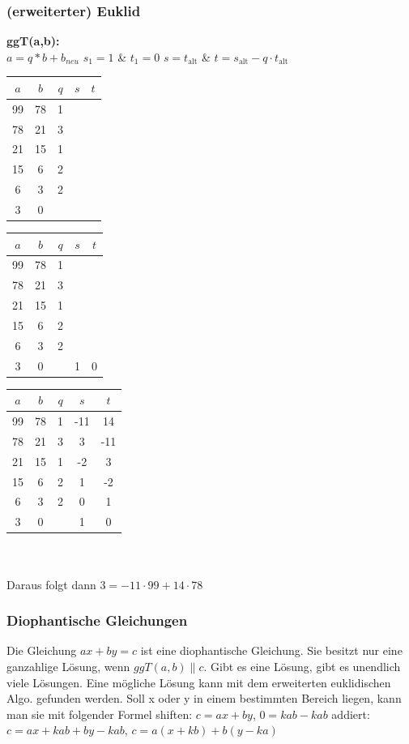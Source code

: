 \documentclass[landscape,twocolumn,a4paper]{article}
\newcommand{\T}[1]{\text{#1}} %
\begin{document}
\subsubsection{(erweiterter) Euklid}
\textbf{ggT(a,b):} \\
$a=q*b+b_{neu}$ \hspace*{1cm} $s_1=1$ \& $t_1=0$ \hspace*{0.75cm} $s=t_{\T{alt}}$ \& $t=s_{\T{alt}}-q\cdot t_{\T{alt}}$\\
\begin{tabular}{| c | c | c | c | c |}
   \hline
   $a$ & $b$ & $q$ & $s$ & $t$ \\
   \hline
   99 & 78 & 1 &  & \\
   78 & 21 & 3 &  & \\
   21 & 15 & 1 &  & \\
   15 & 6 & 2 &  & \\
   6 & 3 & 2 &  & \\
   3 & 0 &  &  & \\\hline
\end{tabular}
\begin{tabular}{| c | c | c | c | c |}
   \hline
   $a$ & $b$ & $q$ & $s$ & $t$ \\
   \hline
   99 & 78 & 1 &  & \\
   78 & 21 & 3 &  & \\
   21 & 15 & 1 &  & \\
   15 & 6 & 2 &  & \\
   6 & 3 & 2 &  & \\
   3 & 0 &  & 1 & 0 \\\hline
\end{tabular}
\begin{tabular}{| c | c | c | c | c |}
   \hline
   $a$ & $b$ & $q$ & $s$ & $t$ \\
   \hline
   99 & 78 & 1 & -11 & 14\\
   78 & 21 & 3 & 3 & -11\\
   21 & 15 & 1 & -2 & 3\\
   15 & 6 & 2 & 1 & -2\\
   6 & 3 & 2 & 0 & 1\\
   3 & 0 &  & 1 & 0 \\\hline
\end{tabular}\\
\\
Daraus folgt dann $3=-11\cdot99+14\cdot78$
\subsubsection{Diophantische Gleichungen}
Die Gleichung $ax + by = c$ ist eine diophantische Gleichung. Sie besitzt nur eine ganzahlige Lösung, wenn $ggT(a, b)\|c$. Gibt es eine Lösung, gibt es unendlich viele Lösungen. Eine mögliche Lösung kann mit dem erweiterten euklidischen Algo. gefunden werden. Soll x oder y in einem bestimmten Bereich liegen, kann man sie mit folgender Formel shiften: $c = ax + by$, $0 = kab - kab$ addiert: $c = ax + kab + by - kab$, $c = a(x + kb) + b(y - ka)$
\end{document}
